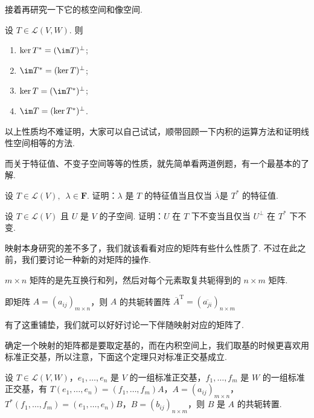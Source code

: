 接着再研究一下它的核空间和像空间.

设 $ T \in \mathcal{L}(V, W) $. 则

\begin{enumerate}
    \item $ \ker T^* = (\im T)^{\perp} $;

    \item $ \im T^* = (\ker T)^{\perp} $;

    \item $ \ker T = (\im T^*)^{\perp} $;

    \item $ \im T = (\ker T^*)^{\perp} $.
\end{enumerate}

以上性质均不难证明，大家可以自己试试，顺带回顾一下内积的运算方法和证明线性空间相等的方法.

而关于特征值、不变子空间等等的性质，就先简单看两道例题，有一个最基本的了解.

\begin{example} \label{ex:24:伴随与特征值}
    设 $ T \in \mathcal{L}(V),\enspace \lambda \in \mathbf{F} $. 证明：$ \lambda $ 是 $ T $ 的特征值当且仅当 $ \overline{\lambda} $是 $ T^* $ 的特征值.
\end{example}

\begin{example} \label{ex:24:伴随与不变子空间}
    设 $ T \in \mathcal{L}(V) $ 且 $ U $ 是 $ V $ 的子空间. 证明：$ U $ 在 $ T $ 下不变当且仅当 $ U^{\perp} $ 在 $ T^* $ 下不变.
\end{example}

映射本身研究的差不多了，我们就该看看对应的矩阵有些什么性质了. 不过在此之前，我们要讨论一种新的对矩阵的操作.

\begin{definition}[共轭转置]
    $ m \times n $ 矩阵的是先互换行和列，然后对每个元素取复共轭得到的 $ n \times m $ 矩阵.

    即矩阵 $ A = (a_{ij})_{m \times n} $，则 $ A $ 的共轭转置阵 $ \overline{A}^{\mathrm{T}} = (\overline{a_{ji}})_{n \times m} $
\end{definition}

有了这重铺垫，我们就可以好好讨论一下伴随映射对应的矩阵了.

确定一个映射的矩阵都是要取定基的，而在内积空间上，我们取基的时候更喜欢用标准正交基，所以注意，下面这个定理只对标准正交基成立.

\begin{theorem}
    设 $ T \in \mathcal{L}(V, W) $，$ e_1, \ldots , e_n $ 是 $ V $ 的一组标准正交基，$ f_1, \ldots , f_m $ 是 $ W $ 的一组标准正交基，有 $ T(e_1, \ldots , e_n) = (f_1, \ldots , f_m)A $，$ A = (a_{ij})_{m \times n} $，$ T^*(f_1, \ldots , f_m) =(e_1, \ldots , e_n)B $，$ B = (b_{ij})_{n \times m} $，则 $ B $ 是 $ A $ 的共轭转置.
\end{theorem}

